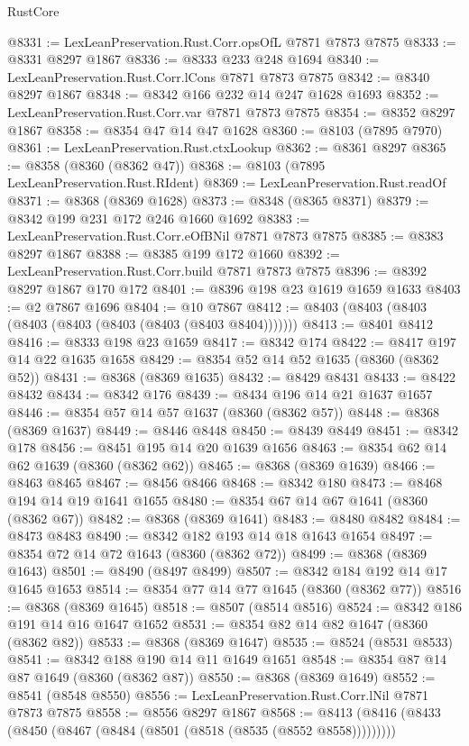 \begin{lexlean}{RustCore}
\begin{coremodule}
@8331 := LexLeanPreservation.Rust.Corr.opsOfL @7871 @7873 @7875
@8333 := @8331 @8297 @1867
@8336 := @8333 @233 @248 @1694
@8340 := LexLeanPreservation.Rust.Corr.lCons @7871 @7873 @7875
@8342 := @8340 @8297 @1867
@8348 := @8342 @166 @232 @14 @247 @1628 @1693
@8352 := LexLeanPreservation.Rust.Corr.var @7871 @7873 @7875
@8354 := @8352 @8297 @1867
@8358 := @8354 @47 @14 @47 @1628
@8360 := @8103 (@7895 @7970)
@8361 := LexLeanPreservation.Rust.ctxLookup
@8362 := @8361 @8297
@8365 := @8358 (@8360 (@8362 @47))
@8368 := @8103 (@7895 LexLeanPreservation.Rust.RIdent)
@8369 := LexLeanPreservation.Rust.readOf
@8371 := @8368 (@8369 @1628)
@8373 := @8348 (@8365 @8371)
@8379 := @8342 @199 @231 @172 @246 @1660 @1692
@8383 := LexLeanPreservation.Rust.Corr.eOfBNil @7871 @7873 @7875
@8385 := @8383 @8297 @1867
@8388 := @8385 @199 @172 @1660
@8392 := LexLeanPreservation.Rust.Corr.build @7871 @7873 @7875
@8396 := @8392 @8297 @1867 @170 @172
@8401 := @8396 @198 @23 @1619 @1659 @1633
@8403 := @2 @7867 @1696
@8404 := @10 @7867
@8412 := @8403 (@8403 (@8403 (@8403 (@8403 (@8403 (@8403 (@8403 @8404)))))))
@8413 := @8401 @8412
@8416 := @8333 @198 @23 @1659
@8417 := @8342 @174
@8422 := @8417 @197 @14 @22 @1635 @1658
@8429 := @8354 @52 @14 @52 @1635 (@8360 (@8362 @52))
@8431 := @8368 (@8369 @1635)
@8432 := @8429 @8431
@8433 := @8422 @8432
@8434 := @8342 @176
@8439 := @8434 @196 @14 @21 @1637 @1657
@8446 := @8354 @57 @14 @57 @1637 (@8360 (@8362 @57))
@8448 := @8368 (@8369 @1637)
@8449 := @8446 @8448
@8450 := @8439 @8449
@8451 := @8342 @178
@8456 := @8451 @195 @14 @20 @1639 @1656
@8463 := @8354 @62 @14 @62 @1639 (@8360 (@8362 @62))
@8465 := @8368 (@8369 @1639)
@8466 := @8463 @8465
@8467 := @8456 @8466
@8468 := @8342 @180
@8473 := @8468 @194 @14 @19 @1641 @1655
@8480 := @8354 @67 @14 @67 @1641 (@8360 (@8362 @67))
@8482 := @8368 (@8369 @1641)
@8483 := @8480 @8482
@8484 := @8473 @8483
@8490 := @8342 @182 @193 @14 @18 @1643 @1654
@8497 := @8354 @72 @14 @72 @1643 (@8360 (@8362 @72))
@8499 := @8368 (@8369 @1643)
@8501 := @8490 (@8497 @8499)
@8507 := @8342 @184 @192 @14 @17 @1645 @1653
@8514 := @8354 @77 @14 @77 @1645 (@8360 (@8362 @77))
@8516 := @8368 (@8369 @1645)
@8518 := @8507 (@8514 @8516)
@8524 := @8342 @186 @191 @14 @16 @1647 @1652
@8531 := @8354 @82 @14 @82 @1647 (@8360 (@8362 @82))
@8533 := @8368 (@8369 @1647)
@8535 := @8524 (@8531 @8533)
@8541 := @8342 @188 @190 @14 @11 @1649 @1651
@8548 := @8354 @87 @14 @87 @1649 (@8360 (@8362 @87))
@8550 := @8368 (@8369 @1649)
@8552 := @8541 (@8548 @8550)
@8556 := LexLeanPreservation.Rust.Corr.lNil @7871 @7873 @7875
@8558 := @8556 @8297 @1867
@8568 := @8413 (@8416 (@8433 (@8450 (@8467 (@8484 (@8501 (@8518 (@8535 (@8552 @8558)))))))))

\end{coremodule}
\end{lexlean}
